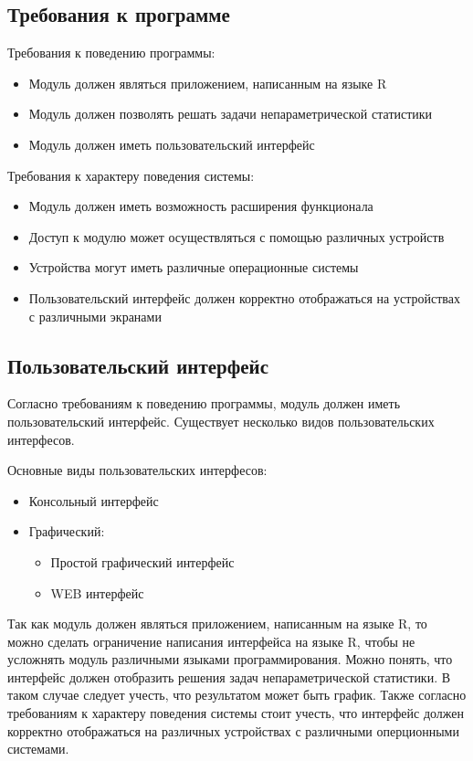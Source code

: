 \documentclass[14pt,a4paper]{scrartcl}
\begin{document}
    \subsection{Требования к программе}
    Требования к поведению программы:
    \begin{itemize}
        \item Модуль должен являться приложением, написанным на языке R
        \item Модуль должен позволять решать задачи непараметрической статистики
        \item Модуль должен иметь пользовательский интерфейс
    \end{itemize}

    Требования к характеру поведения системы:
    \begin{itemize}
        \item Модуль должен иметь возможность расширения функционала
        \item Доступ к модулю может осуществляться с помощью различных устройств
        \item Устройства могут иметь различные операционные системы
        \item Пользовательский интерфейс должен корректно отображаться на устройствах с различными экранами
    \end{itemize}

    \subsection{Пользовательский интерфейс}
    Согласно требованиям к поведению программы, модуль должен иметь пользовательский интерфейс. Существует несколько видов пользовательских интерфесов.

    Основные виды пользовательских интерфесов:
    \begin{itemize}
        \item Консольный интерфейс
        \item Графический:
        \begin{itemize}
            \item Простой графический интерфейс
            \item WEB интерфейс
        \end{itemize}
    \end{itemize}

    Так как модуль должен являться приложением, написанным на языке R, то можно сделать ограничение написания интерфейса на языке R, чтобы не усложнять модуль различными языками программирования. Можно понять, что интерфейс должен отобразить решения задач непараметрической статистики. В таком случае следует учесть, что результатом может быть график. Также согласно требованиям к характеру поведения системы стоит учесть, что интерфейс должен корректно отображаться на различных устройствах с различными оперционными системами.
\end{document}

